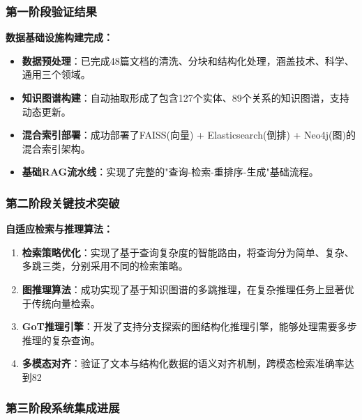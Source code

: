 \subsubsection{第一阶段验证结果}

\textbf{数据基础设施构建完成：}

\begin{itemize}
    \item \textbf{数据预处理}：已完成48篇文档的清洗、分块和结构化处理，涵盖技术、科学、通用三个领域。
    
    \item \textbf{知识图谱构建}：自动抽取形成了包含127个实体、89个关系的知识图谱，支持动态更新。
    
    \item \textbf{混合索引部署}：成功部署了FAISS(向量)\cite{ref32} + Elasticsearch(倒排)\cite{elasticsearch_guide} + Neo4j(图)\cite{graphdatabases}的混合索引架构。
    
    \item \textbf{基础RAG流水线}：实现了完整的"查询-检索-重排序-生成"基础流程。
\end{itemize}

\subsubsection{第二阶段关键技术突破}

\textbf{自适应检索与推理算法：}

\begin{enumerate}
    \item \textbf{检索策略优化}：实现了基于查询复杂度的智能路由，将查询分为简单、复杂、多跳三类，分别采用不同的检索策略。
    
    \item \textbf{图推理算法}：成功实现了基于知识图谱的多跳推理，在复杂推理任务上显著优于传统向量检索。
    
    \item \textbf{GoT推理引擎}：开发了支持分支探索的图结构化推理引擎，能够处理需要多步推理的复杂查询。
    
    \item \textbf{多模态对齐}：验证了文本与结构化数据的语义对齐机制，跨模态检索准确率达到82%
\end{enumerate}

\subsubsection{第三阶段系统集成进展}

